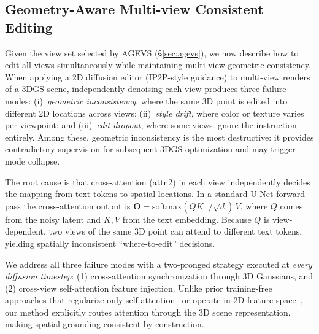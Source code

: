 
\subsection{Geometry-Aware Multi-view Consistent Editing}
\label{sec:geom_consistent_editing}

Given the view set selected by AGEVS (\S\ref{sec:agevs}), we now describe how to edit all views simultaneously while maintaining multi-view geometric consistency.
When applying a 2D diffusion editor (IP2P-style guidance) to multi-view renders of a 3DGS scene, independently denoising each view produces three failure modes: (i)~\emph{geometric inconsistency}, where the same 3D point is edited into different 2D locations across views; (ii)~\emph{style drift}, where color or texture varies per viewpoint; and (iii)~\emph{edit dropout}, where some views ignore the instruction entirely.
Among these, geometric inconsistency is the most destructive: it provides contradictory supervision for subsequent 3DGS optimization and may trigger mode collapse.

The root cause is that cross-attention (attn2) in each view independently decides the mapping from text tokens to spatial locations.
In a standard U-Net forward pass the cross-attention output is $\mathbf{O}=\mathrm{softmax}(QK^\top/\!\sqrt{d})\,V$, where $Q$ comes from the noisy latent and $K,V$ from the text embedding.
Because $Q$ is view-dependent, two views of the same 3D point can attend to different text tokens, yielding spatially inconsistent ``where-to-edit'' decisions.

We address all three failure modes with a two-pronged strategy executed at \emph{every diffusion timestep}: (1) cross-attention synchronization through 3D Gaussians, and (2) cross-view self-attention feature injection.
Unlike prior training-free approaches that regularize only self-attention~\cite{chen_gaussianeditor_2024} or operate in 2D feature space~\cite{wang_vcedit_2025}, our method explicitly routes attention through the 3D scene representation, making spatial grounding consistent by construction.

